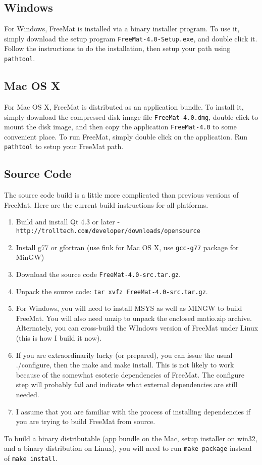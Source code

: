 \subsection{Windows}

For Windows, FreeMat is installed via a binary installer program.  To use it,
simply download the setup program \verb|FreeMat-4.0-Setup.exe|, and double
click it.  Follow the instructions to do the installation, then setup your path
using \verb|pathtool|.
\subsection{Mac OS X}

For Mac OS X, FreeMat is distributed as an application bundle.  To install it,
simply download the compressed disk image file \verb|FreeMat-4.0.dmg|, double
click to mount the disk image, and then copy the application \verb|FreeMat-4.0| to
some convenient place.  To run FreeMat, simply double click on the application.  Run
\verb|pathtool| to setup your FreeMat path.
\subsection{Source Code}

The source code build is a little more complicated than previous versions of FreeMat.  Here
are the current build instructions for all platforms.
\begin{enumerate}
\item  Build and install Qt 4.3 or later - \verb|http://trolltech.com/developer/downloads/opensource|

\item  Install g77 or gfortran (use fink for Mac OS X, use \verb|gcc-g77| package for MinGW)

\item  Download the source code \verb|FreeMat-4.0-src.tar.gz|.

\item  Unpack the source code: \verb|tar xvfz FreeMat-4.0-src.tar.gz|.

\item  For Windows, you will need to install MSYS as well as MINGW to
build FreeMat.  You will also need unzip to unpack the enclosed
matio.zip archive.  Alternately, you can cross-build the WIndows version
of FreeMat under Linux (this is how I build it now).

\item  If you are extraordinarily lucky (or prepared), you can issue the
usual ./configure, then the make and make install.
This is not likely to work
because of the somewhat esoteric dependencies of FreeMat.  The configure
step will probably fail and indicate what external dependencies are
still needed. 

\item  I assume that you are familiar with the process of installing 
dependencies if you are trying to build FreeMat from source.

\end{enumerate}
To build a binary distributable (app bundle on the Mac, setup
installer on win32, and a binary distribution on Linux), you will
need to run \verb|make package| instead of \verb|make install|.
